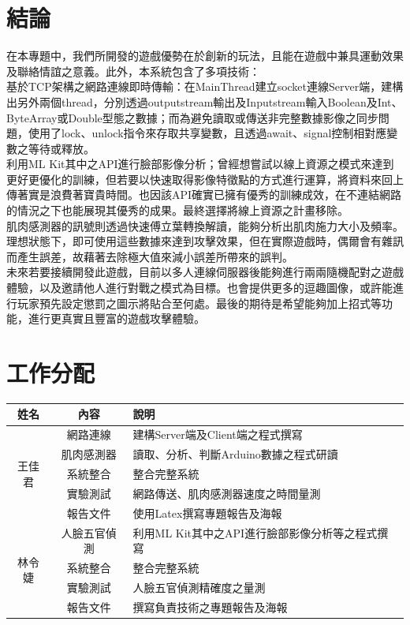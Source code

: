 \documentclass[12pt]{article}  %
\theoremstyle{plain}
\begin{document}
\section{結論}
在本專題中，我們所開發的遊戲優勢在於創新的玩法，且能在遊戲中兼具運動效果及聯絡情誼之意義。此外，本系統包含了多項技術：\\
\indent 基於TCP架構之網路連線即時傳輸：在MainThread建立socket連線Server端，建構出另外兩個thread，分別透過outputstream輸出及Inputstream輸入Boolean及Int、ByteArray或Double型態之數據；而為避免讀取或傳送非完整數據影像之同步問題，使用了lock、unlock指令來存取共享變數，且透過await、signal控制相對應變數之等待或釋放。\\
\indent 利用ML Kit其中之API進行臉部影像分析；曾經想嘗試以線上資源之模式來達到更好更優化的訓練，但若要以快速取得影像特徵點的方式進行運算，將資料來回上傳著實是浪費著寶貴時間。也因該API確實已擁有優秀的訓練成效，在不連結網路的情況之下也能展現其優秀的成果。最終選擇將線上資源之計畫移除。\\
\indent 肌肉感測器的訊號則透過快速傅立葉轉換解讀，能夠分析出肌肉施力大小及頻率。理想狀態下，即可使用這些數據來達到攻擊效果，但在實際遊戲時，偶爾會有雜訊而產生誤差，故藉著去除極大值來減小誤差所帶來的誤判。\\
\indent 未來若要接續開發此遊戲，目前以多人連線伺服器後能夠進行兩兩隨機配對之遊戲體驗，以及邀請他人進行對戰之模式為目標。也會提供更多的逗趣圖像，或許能進行玩家預先設定懲罰之圖示將貼合至何處。最後的期待是希望能夠加上招式等功能，進行更真實且豐富的遊戲攻擊體驗。
\newpage

\section{工作分配}
\begin{tabular}{|c|c|p{9.5cm}|}
\hline
\cellcolor[HTML]{B2BEB5}姓名 & \cellcolor[HTML]{B2BEB5}內容 & \cellcolor[HTML]{B2BEB5}說明\\
\hline\hline
\multirow{5}{*}{王佳君} & 網路連線 & 建構Server端及Client端之程式撰寫 \\
\cline{2-3}
\multirow{5}{*}{} & 肌肉感測器 & 讀取、分析、判斷Arduino數據之程式研讀 \\
\cline{2-3}
\multirow{5}{*}{} & 系統整合 & 整合完整系統 \\
\cline{2-3}
\multirow{5}{*}{} & 實驗測試 & 網路傳送、肌肉感測器速度之時間量測 \\
\cline{2-3}
\multirow{5}{*}{} & 報告文件 & 使用Latex撰寫專題報告及海報 \\
\hline
\multirow{4}{*}{林令婕} & 人臉五官偵測 & 利用ML Kit其中之API進行臉部影像分析等之程式撰寫 \\
\cline{2-3}
\multirow{4}{*}{} & 系統整合 & 整合完整系統 \\
\cline{2-3}
\multirow{4}{*}{} & 實驗測試 & 人臉五官偵測精確度之量測 \\
\cline{2-3}
\multirow{4}{*}{} & 報告文件 & 撰寫負責技術之專題報告及海報 \\
\hline
\end{tabular}
\newpage
\end{document}
